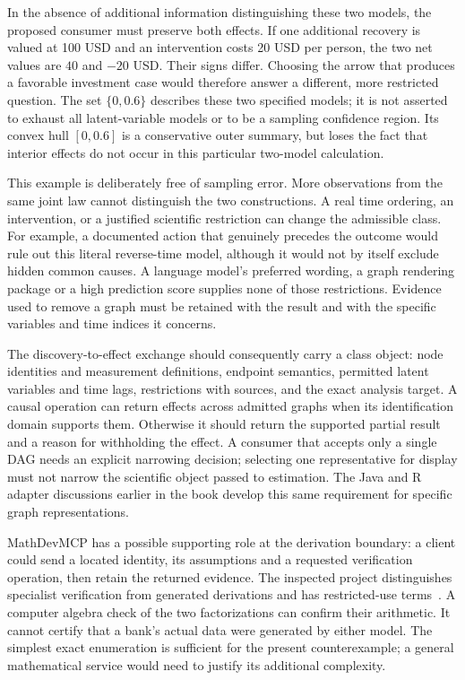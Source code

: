 In the absence of additional information distinguishing these two models,
the proposed consumer must preserve both effects. If one additional recovery
is valued at 100 USD and an intervention costs 20 USD per person, the two
net values are $40$ and $-20$ USD. Their signs differ. Choosing the arrow
that produces a favorable investment case would therefore answer a different,
more restricted question. The set $\{0,0.6\}$ describes these two specified
models; it is not asserted to exhaust all latent-variable models or to be a
sampling confidence region. Its convex hull $[0,0.6]$ is a conservative
outer summary, but loses the fact that interior effects do not occur in this
particular two-model calculation.

This example is deliberately free of sampling error. More observations from
the same joint law cannot distinguish the two constructions. A real time
ordering, an intervention, or a justified scientific restriction can change
the admissible class. For example, a documented action that genuinely precedes
the outcome would rule out this literal reverse-time model, although it
would not by itself exclude hidden common causes. A language model's preferred
wording, a graph rendering package or a high prediction score supplies none
of those restrictions. Evidence used to remove a graph must be retained with
the result and with the specific variables and time indices it concerns.

The discovery-to-effect exchange should consequently carry a class object:
node identities and measurement definitions, endpoint semantics, permitted
latent variables and time lags, restrictions with sources, and the exact
analysis target. A causal operation can return effects across admitted graphs
when its identification domain supports them. Otherwise it should return the
supported partial result and a reason for withholding the effect. A consumer
that accepts only a single DAG needs an explicit narrowing decision; selecting
one representative for display must not narrow the scientific object passed
to estimation. The Java and R adapter discussions earlier in the book develop
this same requirement for specific graph representations.

MathDevMCP has a possible supporting role at the derivation boundary: a
client could send a located identity, its assumptions and a requested
verification operation, then retain the returned evidence. The inspected
project distinguishes specialist verification from generated derivations and
has restricted-use terms~\citep{v12_in_inventory}. A computer algebra check of
the two factorizations can confirm their arithmetic. It cannot certify that
a bank's actual data were generated by either model. The simplest exact
enumeration is sufficient for the present counterexample; a general
mathematical service would need to justify its additional complexity.


